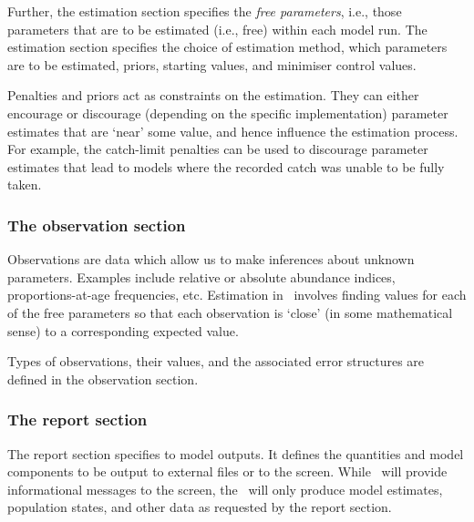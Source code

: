 Further, the estimation section specifies the \emph{free parameters}, i.e., those parameters that are to be estimated (i.e., free) within each model run. The estimation section specifies the choice of estimation method, which parameters are to be estimated, priors, starting values, and minimiser control values.

Penalties and priors act as constraints on the estimation. They can either encourage or discourage (depending on the specific implementation) parameter estimates that are `near' some value, and hence influence the estimation process. For example, the catch-limit penalties can be used to discourage parameter estimates that lead to models where the recorded catch was unable to be fully taken.

\subsubsection{The observation section}

Observations are data which allow us to make inferences about unknown parameters. Examples include relative or absolute abundance indices, proportions-at-age frequencies, etc. Estimation in \SPM\ involves finding values for each of the free parameters so that each observation is `close' (in some mathematical sense) to a corresponding expected value. 

Types of observations, their values, and the associated error structures are defined in the observation section.

\subsubsection{The report section}

The report section specifies to model outputs. It defines the quantities and model components to be output to external files or to the screen. While \SPM\ will provide informational messages to the screen, the \SPM\ will only produce model estimates, population states, and other data as requested by the report section. 
